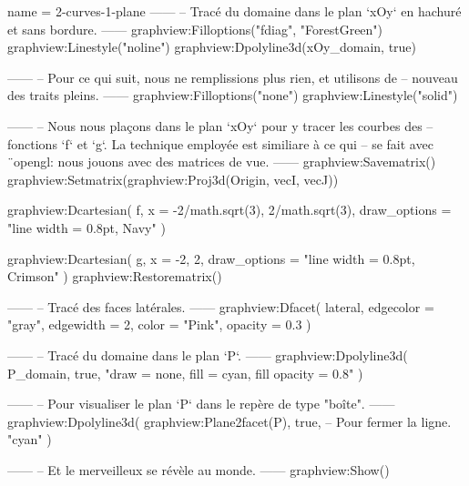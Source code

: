 \documentclass[border = 3pt]{standalone}
\begin{document}
\begin{luadraw}{name = 2-curves-1-plane}
------
-- Tracé du domaine dans le plan `xOy` en hachuré et sans bordure.
------
    graphview:Filloptions("fdiag", "ForestGreen")
    graphview:Linestyle("noline")
    graphview:Dpolyline3d(xOy_domain, true)

------
-- Pour ce qui suit, nous ne remplissions plus rien, et utilisons de
-- nouveau des traits pleins.
------
    graphview:Filloptions("none")
    graphview:Linestyle("solid")

------
-- Nous nous plaçons dans le plan `xOy` pour y tracer les courbes des
-- fonctions  `f` et `g`. La technique employée est similiare à ce qui
-- se fait avec ¨opengl: nous jouons avec des matrices de vue.
------
    graphview:Savematrix()
        graphview:Setmatrix(graphview:Proj3d({Origin, vecI, vecJ}))

        graphview:Dcartesian(
            f,
            {x = {-2/math.sqrt(3), 2/math.sqrt(3)},
            draw_options = "line width = 0.8pt, Navy"
        })

        graphview:Dcartesian(
            g,
            {x = {-2, 2},
            draw_options = "line width = 0.8pt, Crimson"
        })
    graphview:Restorematrix()

------
-- Tracé des faces latérales.
------
    graphview:Dfacet(
        lateral,
        {
            edgecolor = "gray",
            edgewidth = 2,
            color     = "Pink",
            opacity   = 0.3
        })

------
-- Tracé du domaine dans le plan `P`.
------
    graphview:Dpolyline3d(
        P_domain,
        true,
        "draw = none, fill = cyan, fill opacity = 0.8"
    )

------
-- Pour visualiser le plan `P` dans le repère de type "boîte".
------
    graphview:Dpolyline3d(
        graphview:Plane2facet(P),
        true,   -- Pour fermer la ligne.
        "cyan"
     )

------
-- Et le merveilleux se révèle au monde.
------
    graphview:Show()
\end{luadraw}
\end{document}
